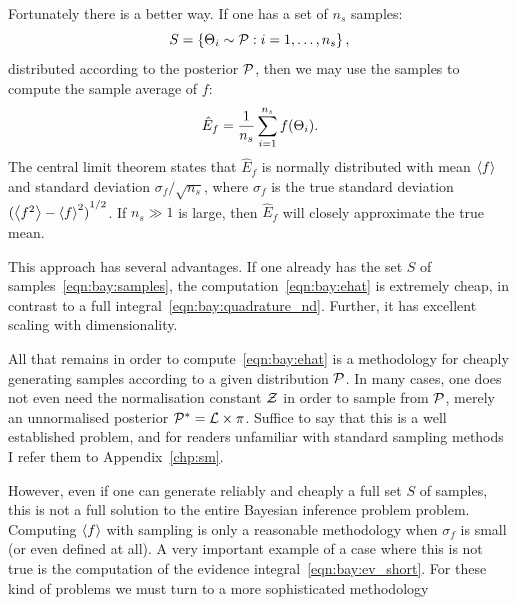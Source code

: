 Fortunately there is a better way. If one has a set of \(n_s\) samples:
\begin{equation}
  S = \left\{ \Theta_i\sim\mathcal{P}:i=1,\ldots,n_s \right\},
  \label{eqn:bay:samples}
\end{equation}
distributed according to the posterior \(\mathcal{P}\), then we may use the samples to compute the sample average of \(f\):
\begin{equation}
  \hat{E}_f = \frac{1}{n_s}\sum\limits_{i=1}^{n_s} f(\Theta_i).
  \label{eqn:bay:ehat}
\end{equation}
The central limit theorem states that \(\hat{E}_f\) is normally distributed with mean \({\left\langle{f}\right\rangle}\) and standard deviation \(\sigma_f/\sqrt{n_s}\), where \(\sigma_f\) is the true standard deviation \({({\left\langle{f^2}\right\rangle}-{\left\langle{f}\right\rangle}^2)}^{1/2}\). If \(n_s\gg 1\) is large, then \(\hat{E}_f\) will closely approximate the true mean. 

This approach has several advantages. If one already has the set \(S\) of samples~\eqref{eqn:bay:samples}, the computation~\eqref{eqn:bay:ehat} is extremely cheap, in contrast to a full integral~\eqref{eqn:bay:quadrature_nd}. Further, it has excellent scaling with dimensionality. 

All that remains in order to compute~\eqref{eqn:bay:ehat} is a methodology for cheaply generating samples according to a given distribution \(\mathcal{P}\). In many cases, one does not even need the normalisation constant \(\mathcal{Z}\) in order to sample from \(\mathcal{P}\), merely an unnormalised posterior \({\mathcal{P}}^\ast= \mathcal{L}\times\pi\). Suffice to say that this is a well established problem, and for readers unfamiliar with standard sampling methods I refer them to Appendix~\ref{chp:sm}.

However, even if one can generate reliably and cheaply a full set \(S\) of samples, this is not a full solution to the entire Bayesian inference problem problem. Computing \({\left\langle{f}\right\rangle}\) with sampling is only a reasonable methodology when \(\sigma_f\) is small (or even defined at all). A very important example of a case where this is not true is the computation of the evidence integral~\eqref{eqn:bay:ev_short}. For these kind of problems we must turn to a more sophisticated methodology



